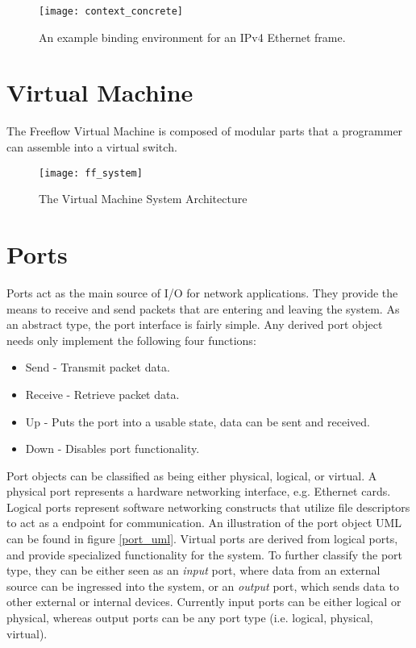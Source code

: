 \begin{figure}[h]
\centering
\texttt{[image: context\_concrete]}
\caption{An example binding environment for an IPv4 Ethernet frame.}
\label{context_binding}
\end{figure}

\section{Virtual Machine}
\label{vm}
The Freeflow Virtual Machine is composed of modular parts that a programmer can
assemble into a virtual switch.

\begin{figure}[h]
\centering
\texttt{[image: ff\_system]}
\caption{The Virtual Machine System Architecture}
\label{ff_system}
\end{figure}

\section{Ports}
\label{vm:port}
Ports act as the main source of I/O for network applications. They provide the
means to receive and send packets that are entering and leaving the system. As
an abstract type, the port interface is fairly simple. Any derived port object
needs only implement the following four functions:

\begin{itemize}
\item Send - Transmit packet data.
\item Receive - Retrieve packet data.
\item Up - Puts the port into a usable state, data can be sent and received.
\item Down - Disables port functionality.
\end{itemize}

Port objects can be classified as being either physical, logical, or virtual. A
physical port represents a hardware networking interface, e.g. Ethernet cards.
Logical ports represent software networking constructs that utilize file
descriptors to act as a endpoint for communication. An illustration of the port
object UML can be found in figure \ref{port_uml}. Virtual ports are derived
from logical ports, and provide specialized functionality for the system. To
further classify the port type, they can be either seen as an \emph{input}
port, where data from an external source can be ingressed into the system, or an
\emph{output} port, which sends data to other external or internal devices.
Currently input ports can be either logical or physical, whereas output ports
can be any port type (i.e. logical, physical, virtual).

